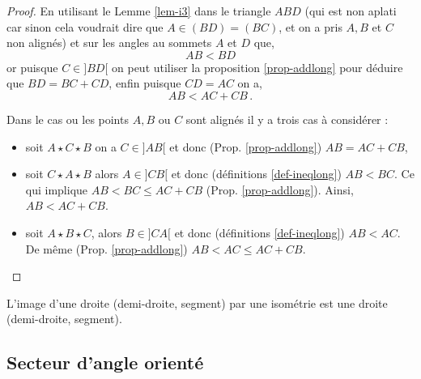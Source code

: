 \begin{thm}
\begin{proof}
En utilisant le Lemme \ref{lem-i3} dans le triangle $ABD$ (qui est non aplati car sinon cela voudrait dire que $A\in (BD)=(BC)$, et on a pris $A,B$ et $C$ non alignés) et sur les angles au sommets $A$ et $D$ que,
\begin{equation*}
AB<BD
\end{equation*}
or puisque $C\in ]BD[$ on peut utiliser la proposition \ref{prop-addlong} pour déduire que $BD=BC+CD$, enfin puisque $CD=AC$ on a,
\begin{equation*}
AB < AC + CB\,.
\end{equation*}

Dans le cas ou les points $A,B$ ou $C$ sont alignés il y a trois cas à considérer : 
\begin{itemize}[$\bullet$]
\item soit $A\star C \star B$ on  a $C \in ]AB[$ et donc (Prop. \ref{prop-addlong}) $AB = AC + CB$,
\item soit $C\star A \star B$ alors $A\in ]CB[$ et donc (définitions \ref{def-ineqlong}) $AB < BC$.  Ce qui implique $AB < BC \leq AC + CB $  (Prop. \ref{prop-addlong}). Ainsi, $ AB < AC + CB$.
\item soit  $A\star B \star C$, alors $B\in ]CA[$ et donc (définitions \ref{def-ineqlong}) $AB < AC$. De même (Prop. \ref{prop-addlong}) $AB < AC \leq AC + CB$. 
\end{itemize}
\end{proof}
\end{thm}

\begin{cor}
    L'image d'une droite (demi-droite, segment) par une isométrie est une droite (demi-droite, segment). 
\end{cor}

        \subsection{Secteur d'angle orienté}

